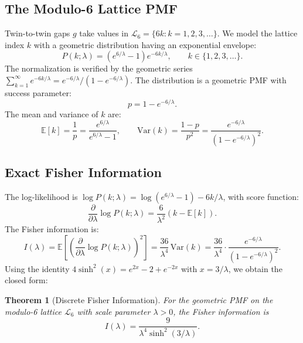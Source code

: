 \documentclass[11pt]{article}
\newtheorem{theorem}{Theorem}
\begin{document}
\subsection{The Modulo-6 Lattice PMF}

Twin-to-twin gaps $g$ take values in $\mathcal{L}_6 = \{6k : k = 1, 2, 3, \ldots\}$. We model the lattice index $k$ with a geometric distribution having an exponential envelope:
\begin{equation}
    P(k; \lambda) = \left(e^{6/\lambda} - 1\right) e^{-6k/\lambda}, \qquad k \in \{1, 2, 3, \ldots\}.
\end{equation}
The normalization is verified by the geometric series $\sum_{k=1}^\infty e^{-6k/\lambda} = e^{-6/\lambda}/(1 - e^{-6/\lambda})$. The distribution is a geometric PMF with success parameter:
\begin{equation}
    p = 1 - e^{-6/\lambda}.
\end{equation}
The mean and variance of $k$ are:
\begin{equation}
    \mathbb{E}[k] = \frac{1}{p} = \frac{e^{6/\lambda}}{e^{6/\lambda} - 1}, \qquad
    \text{Var}(k) = \frac{1-p}{p^2} = \frac{e^{-6/\lambda}}{(1 - e^{-6/\lambda})^2}.
\end{equation}

\subsection{Exact Fisher Information}
The log-likelihood is $\log P(k; \lambda) = \log(e^{6/\lambda} - 1) - 6k/\lambda$, with score function:
\begin{equation}
    \frac{\partial}{\partial \lambda} \log P(k; \lambda) = \frac{6}{\lambda^2}\left(k - \mathbb{E}[k]\right).
\end{equation}
The Fisher information is:
\begin{equation}
    I(\lambda) = \mathbb{E}\left[\left(\frac{\partial}{\partial \lambda} \log P(k; \lambda)\right)^2\right]
    = \frac{36}{\lambda^4}\,\text{Var}(k)
    = \frac{36}{\lambda^4} \cdot \frac{e^{-6/\lambda}}{(1 - e^{-6/\lambda})^2}.
\end{equation}
Using the identity $4\sinh^2(x) = e^{2x} - 2 + e^{-2x}$ with $x = 3/\lambda$, we obtain the closed form:

\begin{theorem}[Discrete Fisher Information]
For the geometric PMF on the modulo-6 lattice $\mathcal{L}_6$ with scale parameter $\lambda > 0$, the Fisher information is
\begin{equation}
    I(\lambda) = \frac{9}{\lambda^4 \sinh^2(3/\lambda)}.
\end{equation}
\end{theorem}
\end{document}
